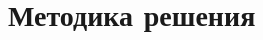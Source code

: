 \documentclass[../homework.tex]{subfiles}
\begin{document}
\section{Методика решения}

\blindtext[2-4]
\end{document}
